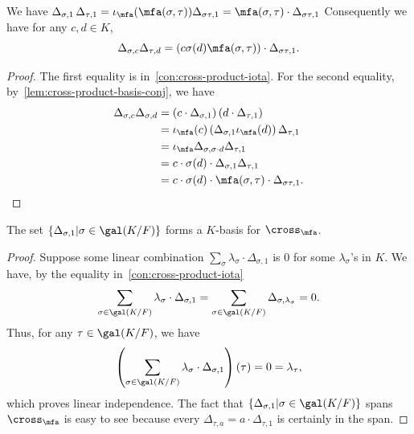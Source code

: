  \begin{lemma}\label{lem:cross-product-basis-mul}
   We have $\Delta_{\sigma,1}\,\Delta_{\tau,1} = \iota_{\mfa}(\mfa(\sigma,\tau))\Delta_{\sigma\tau,1} = \mfa(\sigma,\tau)\cdot\Delta_{\sigma\tau,1}$
   Consequently we have for any $c, d \in K$,
   \[
     \Delta_{\sigma, c}\Delta_{\tau,d} = \left(c \sigma(d)\mfa(\sigma,\tau)\right) \cdot \Delta_{\sigma\tau, 1}.
   \]
   \leanok
 \end{lemma}
 \begin{proof}
   The first equality is in~\cref{con:cross-product-iota}.
   For the second equality, by~\cref{lem:cross-product-basis-conj}, we have
   \[
     \begin{aligned}
       \Delta_{\sigma,c}\Delta_{\sigma,d}
       &= \left(c\cdot\Delta_{\sigma, 1}\right)\left(d\cdot\Delta_{\tau,1}\right) \\
       &= \iota_{\mfa}(c)\left(\Delta_{\sigma, 1}\iota_{\mfa}(d)\right)\Delta_{\tau, 1} \\
       &= \iota_{\mfa}\Delta_{\sigma, \sigma \cdot d}\Delta_{\tau, 1}\\
       &= c \cdot \sigma(d) \cdot \Delta_{\sigma, 1}\Delta_{\tau, 1} \\
       &= c \cdot \sigma(d)\cdot\mfa(\sigma,\tau)\cdot\Delta_{\sigma\tau,1}.\\
     \end{aligned}
   \]
 \end{proof}


 \begin{lemma}
   \label{lem:cross-product-basis}
   The set $\{\Delta_{\sigma, 1}|\sigma\in\gal(K/F)\}$ forms a $K$-basis for $\cross_{\mfa}$.
   \leanok
 \end{lemma}
 \begin{proof}
   Suppose some linear combination $\sum_{\sigma}\lambda_{\sigma}\cdot\Delta_{\sigma, 1}$ is $0$ for some $\lambda_{\sigma}$'s in $K$. We have, by the equality in~\cref{con:cross-product-iota}
   \[
       \sum_{\sigma\in\gal(K/F)}\lambda_{\sigma}\cdot\Delta_{\sigma,1}
       = \sum_{\sigma\in\gal(K/F)}\Delta_{\sigma,\lambda_{\sigma}} = 0.\\
     \]
     Thus, for any $\tau \in \gal(K/F)$, we have
     \[
\left(\sum_{\sigma\in\gal(K/F)}\lambda_{\sigma}\cdot \Delta_{\sigma,1}\right)(\tau) = 0 = \lambda_{\tau},
\]
which proves linear independence. The fact that $\{\Delta_{\sigma, 1}|\sigma\in\gal(K/F)\}$ spans $\cross_{\mfa}$ is easy to see because every $\Delta_{\tau, a} = a \cdot \Delta_{\tau, 1}$ is certainly in the span.
\end{proof}

